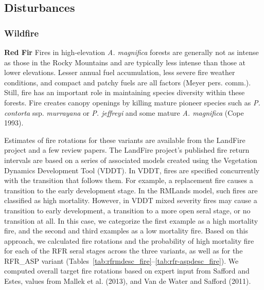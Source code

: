 \subsection*{Disturbances}

\subsubsection{Wildfire}

\textbf{Red Fir} Fires in high-elevation \emph{A. magnifica} forests are generally not as intense as those in the Rocky Mountains and are typically less intense than those at lower elevations. Lesser annual fuel accumulation, less severe fire weather conditions, and compact and patchy fuels are all factors (Meyer pers. comm.). Still, fire has an important role in maintaining species diversity within these forests. Fire creates canopy openings by killing mature pioneer species such as \emph{P. contorta} ssp. \emph{murrayana} or \emph{P. jeffreyi} and some mature \emph{A. magnifica} (Cope 1993). 

Estimates of fire rotations for these variants are available from the LandFire project and a few review papers. The LandFire project’s published fire return intervals are based on a series of associated models created using the Vegetation Dynamics Development Tool (VDDT). In VDDT, fires are specified concurrently with the transition that follows them. For example, a replacement fire causes a transition to the early development stage. In the RMLands model, such fires are classified as high mortality. However, in VDDT mixed severity fires may cause a transition to early development, a transition to a more open seral stage, or no transition at all. In this case, we categorize the first example as a high mortality fire, and the second and third examples as a low mortality fire. Based on this approach, we calculated fire rotations and the probability of high mortality fire for each of the RFR seral stages across the three variants, as well as for the RFR\_ASP variant (Tables~\ref{tab:rfrmdesc_fire}--\ref{tab:rfr-aspdesc_fire}). We computed overall target fire rotations based on expert input from Safford and Estes, values from Mallek et al. (2013), and Van de Water and Safford (2011). 





